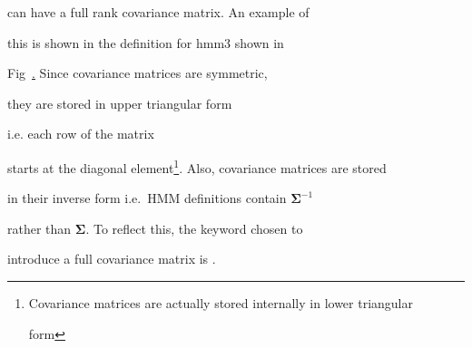 can have a full rank covariance matrix.   An example of


this is shown in the definition for \textsf{hmm3} shown in 


Fig~\href{f:hmm3def}.  Since covariance matrices are symmetric,


they are stored in upper triangular form  


i.e. each row of the matrix


starts at the diagonal element\footnote{


Covariance matrices are actually stored internally in lower triangular


form}.  Also, covariance matrices are stored


in their inverse form i.e.\ HMM definitions contain $\bm{\Sigma}^{-1}$


rather than  $\bm{\Sigma}$.  To reflect this, the keyword chosen to


introduce a full covariance matrix is .  








